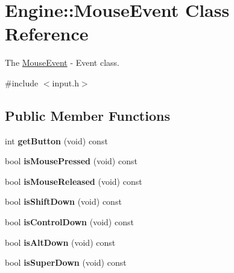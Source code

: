 \hypertarget{classEngine_1_1MouseEvent}{}\section{Engine\+:\+:Mouse\+Event Class Reference}
\label{classEngine_1_1MouseEvent}


The \hyperlink{classEngine_1_1MouseEvent}{Mouse\+Event} -\/ Event class.  




{\ttfamily \#include $<$input.\+h$>$}

\subsection*{Public Member Functions}
\begin{DoxyCompactItemize}
\item 
\hypertarget{classEngine_1_1MouseEvent_aa89c5787692146a78c7452cec6d5def3}{}int {\bfseries get\+Button} (void) const \label{classEngine_1_1MouseEvent_aa89c5787692146a78c7452cec6d5def3}

\item 
\hypertarget{classEngine_1_1MouseEvent_a3c5c3c0da4eb44c2b8c01c3cbdca3045}{}bool {\bfseries is\+Mouse\+Pressed} (void) const \label{classEngine_1_1MouseEvent_a3c5c3c0da4eb44c2b8c01c3cbdca3045}

\item 
\hypertarget{classEngine_1_1MouseEvent_a023008311538aa982f6c73e0b44e7896}{}bool {\bfseries is\+Mouse\+Released} (void) const \label{classEngine_1_1MouseEvent_a023008311538aa982f6c73e0b44e7896}

\item 
\hypertarget{classEngine_1_1MouseEvent_af3f7da6e5669af6c789e91f19ddf20a7}{}bool {\bfseries is\+Shift\+Down} (void) const \label{classEngine_1_1MouseEvent_af3f7da6e5669af6c789e91f19ddf20a7}

\item 
\hypertarget{classEngine_1_1MouseEvent_aad60b23c3b0041ba2fb0b2c7d6e14ce8}{}bool {\bfseries is\+Control\+Down} (void) const \label{classEngine_1_1MouseEvent_aad60b23c3b0041ba2fb0b2c7d6e14ce8}

\item 
\hypertarget{classEngine_1_1MouseEvent_a78faf293d12284ef5781ea2d51c2d4ed}{}bool {\bfseries is\+Alt\+Down} (void) const \label{classEngine_1_1MouseEvent_a78faf293d12284ef5781ea2d51c2d4ed}

\item 
\hypertarget{classEngine_1_1MouseEvent_af3e6ddbac210840fd2f8be68d95e0bdc}{}bool {\bfseries is\+Super\+Down} (void) const \label{classEngine_1_1MouseEvent_af3e6ddbac210840fd2f8be68d95e0bdc}


\end{DoxyCompactItemize}
